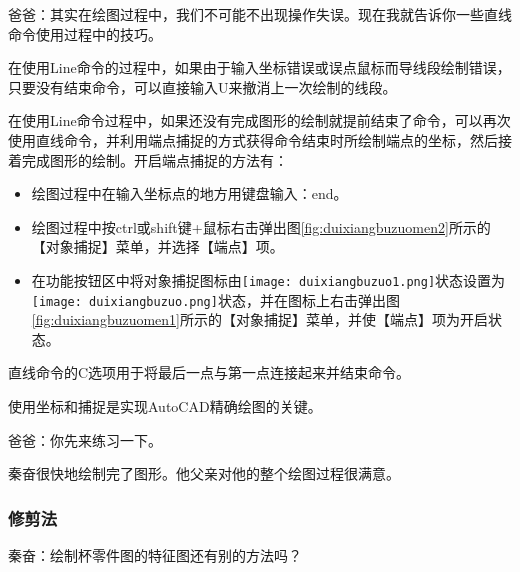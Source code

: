 爸爸：其实在绘图过程中，我们不可能不出现操作失误。现在我就告诉你一些直线命令使用过程中的技巧。
\begin{tips}
\item 在使用Line命令的过程中，如果由于输入坐标错误或误点鼠标而导线段绘制错误，只要没有结束命令，可以直接输入U来撤消上一次绘制的线段。
\item 在使用Line命令过程中，如果还没有完成图形的绘制就提前结束了命令，可以再次使用直线命令，并利用端点捕捉的方式获得命令结束时所绘制端点的坐标，然后接着完成图形的绘制。开启端点捕捉的方法有：
\begin{itemize}
\item 绘图过程中在输入坐标点的地方用键盘输入：end。
\item 绘图过程中按ctrl或shift键+鼠标右击弹出图\ref{fig:duixiangbuzuomen2}所示的【对象捕捉】菜单，并选择【端点】项。
\item 在功能按钮区中将对象捕捉图标由\texttt{[image: duixiangbuzuo1.png]}状态设置为\texttt{[image: duixiangbuzuo.png]}状态，并在图标上右击弹出图\ref{fig:duixiangbuzuomen1}所示的【对象捕捉】菜单，并使【端点】项为开启状态。
\end{itemize}
\item 直线命令的C选项用于将最后一点与第一点连接起来并结束命令。
\item 使用坐标和捕捉是实现AutoCAD精确绘图的关键。
\end{tips}
\begin{figure}[htbp]
\centering
\begin{floatrow}
\end{floatrow}
\end{figure}
爸爸：你先来练习一下。

秦奋很快地绘制完了图形。他父亲对他的整个绘图过程很满意。

\subsubsection{修剪法}
秦奋：绘制杯零件图的特征图还有别的方法吗？

